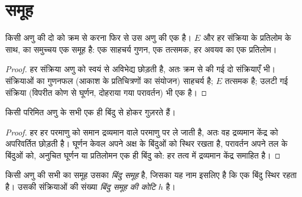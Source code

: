 \section{समूह}

\begin{proposition}\label{prop:b3:point-groups:closure}
किसी अणु की दो  को क्रम से करना फिर से उस अणु की
एक  है। $E$ और हर संक्रिया के प्रतिलोम के साथ,
 का समुच्चय एक समूह है: एक साहचर्य
गुणन, एक तत्समक, हर अवयव का एक प्रतिलोम।
\end{proposition}

\begin{proof}
हर संक्रिया अणु को स्वयं से अविभेद्य छोड़ती है, अतः क्रम से की गई दो
संक्रियाएँ भी। संक्रियाओं का गुणनफल (आकाश के प्रतिचित्रणों का संयोजन)
साहचर्य है; $E$ तत्समक है; उलटी गई संक्रिया (विपरीत कोण से घूर्णन,
दोहराया गया परावर्तन) भी एक  है।
\end{proof}

\begin{proposition}[एक उभयनिष्ठ बिंदु]\label{prop:b3:point-groups:fixed-point}
किसी परिमित अणु के सभी  एक ही बिंदु से होकर गुज़रते हैं।
\end{proposition}

\begin{proof}
हर  हर परमाणु को समान द्रव्यमान वाले परमाणु पर ले जाती है, अतः वह
द्रव्यमान केंद्र को अपरिवर्तित छोड़ती है। घूर्णन केवल अपने अक्ष के बिंदुओं को स्थिर
रखता है, परावर्तन अपने तल के बिंदुओं को, अनुचित घूर्णन या प्रतिलोमन
एक ही बिंदु को: हर तत्व में द्रव्यमान केंद्र समाहित है।
\end{proof}

\begin{definition}[बिंदु समूह, बिंदु समूह की कोटि]\label{def:b3:point-groups:point-group}
किसी अणु की सभी  का समूह उसका \emph{बिंदु
समूह} है, जिसका यह नाम इसलिए है कि एक बिंदु स्थिर रहता है।
उसकी संक्रियाओं की संख्या \emph{बिंदु समूह की कोटि}
$h$ है।
\end{definition}

